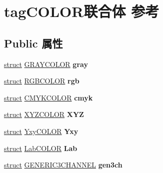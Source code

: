 \hypertarget{uniontag_c_o_l_o_r}{}\section{tag\+C\+O\+L\+O\+R联合体 参考}
\label{uniontag_c_o_l_o_r}
\subsection*{Public 属性}
\begin{DoxyCompactItemize}
\item 
\mbox{\label{uniontag_c_o_l_o_r_a779f5434ac2c9cdecdbf970f4c77cacb}} 
\hyperlink{interfacestruct}{struct} \hyperlink{struct_g_r_a_y_c_o_l_o_r}{G\+R\+A\+Y\+C\+O\+L\+OR} {\bfseries gray}
\item 
\mbox{\label{uniontag_c_o_l_o_r_abd5e83505c2c747fa0fba183e3ea0f89}} 
\hyperlink{interfacestruct}{struct} \hyperlink{struct_r_g_b_c_o_l_o_r}{R\+G\+B\+C\+O\+L\+OR} {\bfseries rgb}
\item 
\mbox{\label{uniontag_c_o_l_o_r_a2458b74f902d66d5b59df6be2a68086b}} 
\hyperlink{interfacestruct}{struct} \hyperlink{struct_c_m_y_k_c_o_l_o_r}{C\+M\+Y\+K\+C\+O\+L\+OR} {\bfseries cmyk}
\item 
\mbox{\label{uniontag_c_o_l_o_r_a89c2b94d68a8398d4627cefdee4d669b}} 
\hyperlink{interfacestruct}{struct} \hyperlink{struct_x_y_z_c_o_l_o_r}{X\+Y\+Z\+C\+O\+L\+OR} {\bfseries X\+YZ}
\item 
\mbox{\label{uniontag_c_o_l_o_r_a0cdd24652cf61eae4f2217687b7d9848}} 
\hyperlink{interfacestruct}{struct} \hyperlink{struct_yxy_c_o_l_o_r}{Yxy\+C\+O\+L\+OR} {\bfseries Yxy}
\item 
\mbox{\label{uniontag_c_o_l_o_r_a92860910ba4d14a22284495b325a2fab}} 
\hyperlink{interfacestruct}{struct} \hyperlink{struct_lab_c_o_l_o_r}{Lab\+C\+O\+L\+OR} {\bfseries Lab}
\item 
\mbox{\label{uniontag_c_o_l_o_r_ab6e6d53c328d22fe73c526ab71695c45}} 
\hyperlink{interfacestruct}{struct} \hyperlink{struct_g_e_n_e_r_i_c3_c_h_a_n_n_e_l}{G\+E\+N\+E\+R\+I\+C3\+C\+H\+A\+N\+N\+EL} {\bfseries gen3ch}

\end{DoxyCompactItemize}
